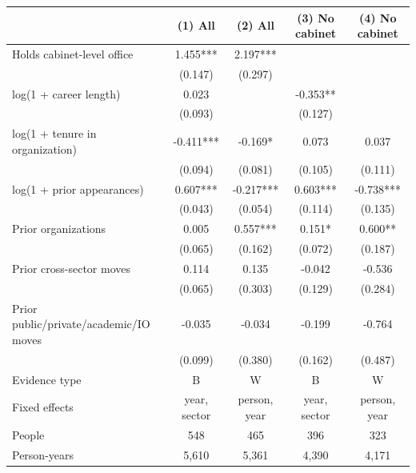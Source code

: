 \begin{tabular}{lcccc}
\toprule
 & (1) All & (2) All & (3) No cabinet & (4) No cabinet \\
\midrule
Holds cabinet-level office & 1.455*** & 2.197*** &  &  \\
 & (0.147) & (0.297) &  &  \\
log(1 + career length) & 0.023 &  & -0.353** &  \\
 & (0.093) &  & (0.127) &  \\
log(1 + tenure in organization) & -0.411*** & -0.169* & 0.073 & 0.037 \\
 & (0.094) & (0.081) & (0.105) & (0.111) \\
log(1 + prior appearances) & 0.607*** & -0.217*** & 0.603*** & -0.738*** \\
 & (0.043) & (0.054) & (0.114) & (0.135) \\
Prior organizations & 0.005 & 0.557*** & 0.151* & 0.600** \\
 & (0.065) & (0.162) & (0.072) & (0.187) \\
Prior cross-sector moves & 0.114 & 0.135 & -0.042 & -0.536 \\
 & (0.065) & (0.303) & (0.129) & (0.284) \\
Prior public/private/academic/IO moves & -0.035 & -0.034 & -0.199 & -0.764 \\
 & (0.099) & (0.380) & (0.162) & (0.487) \\
Evidence type & B & W & B & W \\
Fixed effects & year, sector & person, year & year, sector & person, year \\
People & 548 & 465 & 396 & 323 \\
Person-years & 5,610 & 5,361 & 4,390 & 4,171 \\
\bottomrule
\end{tabular}
